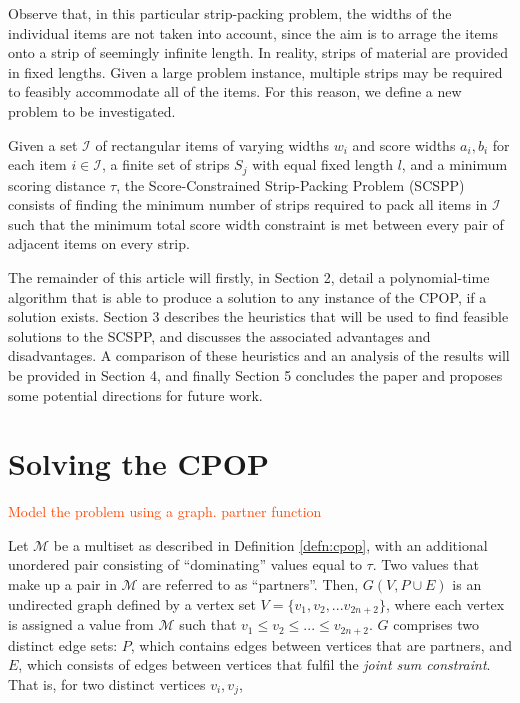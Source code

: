 \documentclass[oribibl]{llncs}
\begin{document}
Observe that, in this particular strip-packing problem, the widths of the individual items are not taken into account, since the aim is to arrage the items onto a strip of seemingly infinite length. In reality, strips of material are provided in fixed lengths. Given a large problem instance, multiple strips may be required to feasibly accommodate all of the items. For this reason, we define a new problem to be investigated.

\begin{definition}
	Given a set $\mathcal{I}$ of rectangular items of varying widths $w_i$ and score widths $a_i, b_i$ for each item $i \in \mathcal{I}$, a finite set of strips $S_j$ with equal fixed length $l$, and a minimum scoring distance $\tau$, the Score-Constrained Strip-Packing Problem (SCSPP) consists of finding the minimum number of strips required to pack all items in $\mathcal{I}$ such that the minimum total score width constraint is met between every pair of adjacent items on every strip.
\end{definition}

The remainder of this article will firstly, in Section 2, detail a polynomial-time algorithm that is able to produce a solution to any instance of the CPOP, if a solution exists. Section 3 describes the heuristics that will be used to find feasible solutions to the SCSPP, and discusses the associated advantages and disadvantages. A comparison of these heuristics and an analysis of the results will be provided in Section 4, and finally Section 5 concludes the paper and proposes some potential directions for future work.


\section{Solving the CPOP}

\textcolor{OrangeRed}{Model the problem using a graph. partner function}

Let $\mathcal{M}$ be a multiset as described in Definition \ref{defn:cpop}, with an additional unordered pair consisting of ``dominating'' values equal to $\tau$. Two values that make up a pair in $\mathcal{M}$ are referred to as ``partners''. Then, $G(V, P \cup E)$ is an undirected graph defined by a vertex set $V = \{v_1, v_2, ...v_{2n+2}\}$, where each vertex is assigned a value from $\mathcal{M}$ such that $v_1 \leq v_2 \leq ... \leq v_{2n+2}$. $G$ comprises two distinct edge sets: $P$, which contains edges between vertices that are partners, and $E$, which consists of edges between vertices that fulfil the \textit{joint sum constraint}. That is, for two distinct vertices $v_i, v_j$,
\end{document}
